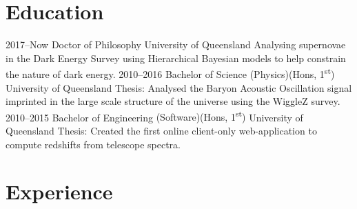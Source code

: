 \documentclass[]{friggeri-cv} %
\begin{document}





\section{Education}

\begin{entrylist}
\entry
{2017--Now}
{Doctor of Philosophy}
{University of Queensland}
{Analysing supernovae in the Dark Energy Survey using Hierarchical Bayesian models to help constrain the nature of dark energy.}
\entry
{2010--2016}
{Bachelor of Science {\normalfont (Physics)(Hons, 1\textsuperscript{st})}}
{University of Queensland}
{Thesis: Analysed the Baryon Acoustic Oscillation signal imprinted in the large scale structure of the universe using the WiggleZ survey.}
\entry
{2010--2015}
{Bachelor of Engineering {\normalfont (Software)(Hons, 1\textsuperscript{st})}}
{University of Queensland}
{Thesis: Created the first online client-only web-application to compute redshifts from telescope spectra.}

\end{entrylist}

\section{Experience}
\end{document}

